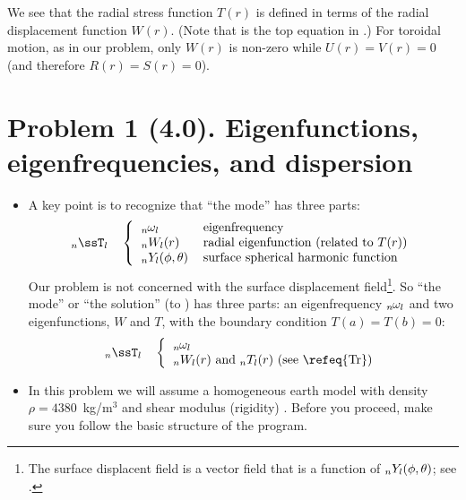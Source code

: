 \documentclass[11pt,titlepage,fleqn]{article}
\begin{document}
We see that the radial stress function $T(r)$ is defined in terms of the radial displacement function $W(r)$. (Note that  is the top equation in .) For toroidal motion, as in our problem, only $W(r)$ is non-zero while $U(r) = V(r) = 0$ (and therefore $R(r) = S(r) = 0$).



\normalsize




\pagebreak
\section*{Problem 1 (4.0). Eigenfunctions, eigenfrequencies, and dispersion}

\begin{itemize}
\item A key point is to recognize that ``the mode''  has three parts:
%
\begin{equation}
\tnl{n}{l} \hspace{10pt} \left\{
\begin{tabular}{ll}
$\omnl$ & eigenfrequency \\
$\Wnl(r)$ & radial eigenfunction (related to $T(r)$) \\
$\Ynl(\phi,\theta)$ & surface spherical harmonic function
\end{tabular} \right.
\end{equation}
%
Our problem is not concerned with the surface displacement field\footnote{The surface displacent field is a vector field that is a function of $\mbox{${}_nY_l$}(\phi,\theta)$; see \citet[][Section 8.6.1]{DT}.}.
So ``the mode'' or ``the solution''  (to ) has three parts: an eigenfrequency $\mbox{${}_{n\hspace{-0.2 mm}}\omega_l$}$ and two eigenfunctions, $W$ and $T$, with the boundary condition $T(a) = T(b) = 0$:
%
\begin{equation}
\tnl{n}{l} \hspace{10pt} \left\{
\begin{tabular}{ll}
$\omnl$  \\
$\Wnl(r)$ and $\Tnl(r)$ (see \refeq{Tr})
\end{tabular} \right.
\end{equation}
%

\item In this problem we will assume a homogeneous earth model with density $\rho = 4380$~kg/m$^3$ and shear modulus (rigidity) . Before you proceed, make sure you follow the basic structure of the program.
\end{itemize}
\end{document}
